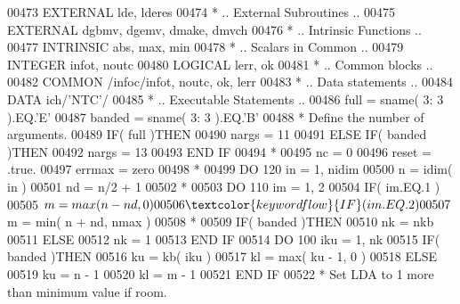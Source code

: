 \begin{DoxyCode}
00473       \textcolor{keywordtype}{EXTERNAL}           lde, lderes
00474 \textcolor{comment}{*     .. External Subroutines ..}
00475       \textcolor{keywordtype}{EXTERNAL}           dgbmv, dgemv, dmake, dmvch
00476 \textcolor{comment}{*     .. Intrinsic Functions ..}
00477       \textcolor{keywordtype}{INTRINSIC}          abs, max, min
00478 \textcolor{comment}{*     .. Scalars in Common ..}
00479       \textcolor{keywordtype}{INTEGER}            infot, noutc
00480       \textcolor{keywordtype}{LOGICAL}            lerr, ok
00481 \textcolor{comment}{*     .. Common blocks ..}
00482       \textcolor{keyword}{COMMON}             /infoc/infot, noutc, ok, lerr
00483 \textcolor{comment}{*     .. Data statements ..}
00484       \textcolor{keyword}{DATA}               ich/\textcolor{stringliteral}{'NTC'}/
00485 \textcolor{comment}{*     .. Executable Statements ..}
00486       full = sname( 3: 3 ).EQ.\textcolor{stringliteral}{'E'}
00487       banded = sname( 3: 3 ).EQ.\textcolor{stringliteral}{'B'}
00488 \textcolor{comment}{*     Define the number of arguments.}
00489       \textcolor{keywordflow}{IF}( full )\textcolor{keywordflow}{THEN}
00490          nargs = 11
00491       \textcolor{keywordflow}{ELSE} \textcolor{keywordflow}{IF}( banded )\textcolor{keywordflow}{THEN}
00492          nargs = 13
00493 \textcolor{keywordflow}{      END IF}
00494 \textcolor{comment}{*}
00495       nc = 0
00496       reset = .true.
00497       errmax = zero
00498 \textcolor{comment}{*}
00499       \textcolor{keywordflow}{DO} 120 in = 1, nidim
00500          n = idim( in )
00501          nd = n/2 + 1
00502 \textcolor{comment}{*}
00503          \textcolor{keywordflow}{DO} 110 im = 1, 2
00504             \textcolor{keywordflow}{IF}( im.EQ.1 )
00505      $         m = max( n - nd, 0 )
00506             \textcolor{keywordflow}{IF}( im.EQ.2 )
00507      $         m = min( n + nd, nmax )
00508 \textcolor{comment}{*}
00509             \textcolor{keywordflow}{IF}( banded )\textcolor{keywordflow}{THEN}
00510                nk = nkb
00511             \textcolor{keywordflow}{ELSE}
00512                nk = 1
00513 \textcolor{keywordflow}{            END IF}
00514             \textcolor{keywordflow}{DO} 100 iku = 1, nk
00515                \textcolor{keywordflow}{IF}( banded )\textcolor{keywordflow}{THEN}
00516                   ku = kb( iku )
00517                   kl = max( ku - 1, 0 )
00518                \textcolor{keywordflow}{ELSE}
00519                   ku = n - 1
00520                   kl = m - 1
00521 \textcolor{keywordflow}{               END IF}
00522 \textcolor{comment}{*              Set LDA to 1 more than minimum value if room.}

\end{DoxyCode}
